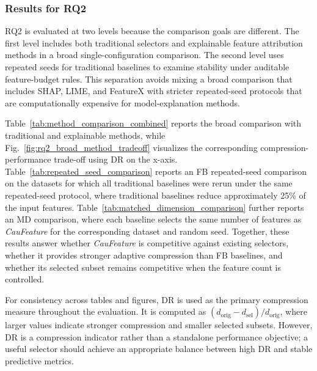 \documentclass[journal]{IEEEtran}
\begin{document}
\subsubsection{Results for RQ2}
RQ2 is evaluated at two levels because the comparison goals are different. The first level includes both traditional selectors and explainable feature attribution methods in a broad single-configuration comparison. The second level uses repeated seeds for traditional baselines to examine stability under auditable feature-budget rules. This separation avoids mixing a broad comparison that includes SHAP, LIME, and FeatureX with stricter repeated-seed protocols that are computationally expensive for model-explanation methods.

Table~\ref{tab:method_comparison_combined} reports the broad comparison with traditional and explainable methods, while Fig.~\ref{fig:rq2_broad_method_tradeoff} visualizes the corresponding compression-performance trade-off using DR on the x-axis. Table~\ref{tab:repeated_seed_comparison} reports an FB repeated-seed comparison on the datasets for which all traditional baselines were rerun under the same repeated-seed protocol, where traditional baselines reduce approximately 25\% of the input features. Table~\ref{tab:matched_dimension_comparison} further reports an MD comparison, where each baseline selects the same number of features as \textit{CauFeature} for the corresponding dataset and random seed. Together, these results answer whether \textit{CauFeature} is competitive against existing selectors, whether it provides stronger adaptive compression than FB baselines, and whether its selected subset remains competitive when the feature count is controlled.

For consistency across tables and figures, DR is used as the primary compression measure throughout the evaluation. It is computed as \((d_{\mathrm{orig}}-d_{\mathrm{sel}})/d_{\mathrm{orig}}\), where larger values indicate stronger compression and smaller selected subsets. However, DR is a compression indicator rather than a standalone performance objective; a useful selector should achieve an appropriate balance between high DR and stable predictive metrics.
\end{document}
